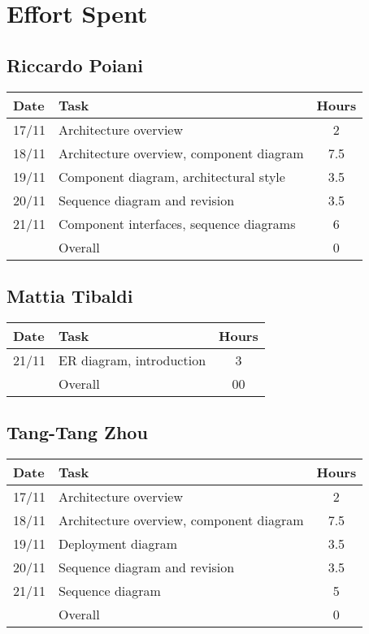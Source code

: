 \section{Effort Spent}

\subsection{Riccardo Poiani}

\begin{table}[H]
\begin{tabularx}{\textwidth}{|l|X|c|}
\hline
\rowcolor[HTML]{C0C0C0} 
Date & Task & Hours\\ \hline
17/11 & Architecture overview & 2\\ \hline
18/11 & Architecture overview, component diagram & 7.5 \\ \hline
19/11 & Component diagram, architectural style & 3.5\\ \hline
20/11 & Sequence diagram and revision & 3.5\\ \hline
21/11 & Component interfaces, sequence diagrams & 6\\ \hline
\rowcolor[HTML]{C0C0C0} 
& Overall & 0 \\ \hline
\end{tabularx}
\end{table}

\subsection{Mattia Tibaldi}

\begin{table}[H]
\begin{tabularx}{\textwidth}{|l|X|c|}
\hline
\rowcolor[HTML]{C0C0C0} 
Date & Task & Hours\\ \hline
21/11 & ER diagram, introduction & 3 \\ \hline
\rowcolor[HTML]{C0C0C0} 
& Overall & 00\\ \hline
\end{tabularx}
\end{table}

\subsection{Tang-Tang Zhou}

\begin{table}[H]
\begin{tabularx}{\textwidth}{|l|X|c|}
\hline
\rowcolor[HTML]{C0C0C0} 
Date & Task & Hours\\ \hline
17/11 & Architecture overview & 2\\ \hline
18/11 & Architecture overview, component diagram & 7.5 \\ \hline
19/11 & Deployment diagram & 3.5\\ \hline
20/11 & Sequence diagram and revision & 3.5\\ \hline
21/11 & Sequence diagram & 5 \\ \hline
\rowcolor[HTML]{C0C0C0} 
& Overall & 0 \\ \hline
\end{tabularx}
\end{table}